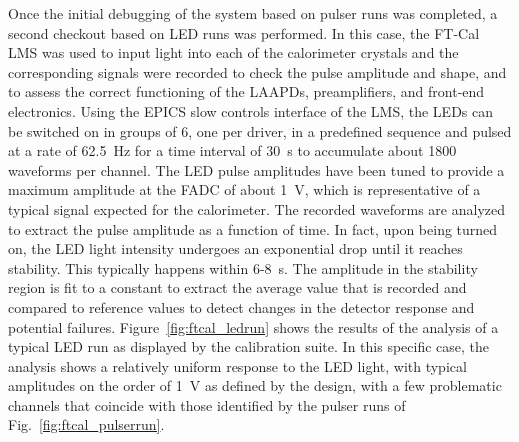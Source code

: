 Once the initial debugging of the system based on pulser runs was completed, a second checkout based on LED runs
was performed. In this case, the FT-Cal LMS was used to input light into each of the calorimeter crystals and the
corresponding signals were recorded to check the pulse amplitude and shape, and to assess the correct functioning of
the LAAPDs, preamplifiers, and front-end electronics. Using the EPICS slow controls interface of the LMS, the LEDs
can be switched on in groups of 6, one per driver, in a predefined sequence and pulsed at a rate of 62.5~Hz for a time
interval of 30~s to accumulate about 1800 waveforms per channel. The LED pulse amplitudes have been tuned to
provide a maximum amplitude at the FADC of about 1~V, which is representative of a typical signal expected for the
calorimeter. The recorded waveforms are analyzed to extract the pulse amplitude as a function of time. In fact, upon
being turned on, the LED light intensity undergoes an exponential drop until it reaches stability. This typically happens
within 6-8~s. The amplitude in the stability region is fit to a constant to extract the average value that is recorded
and compared to reference values to detect changes in the detector response and potential failures.
Figure~\ref{fig:ftcal_ledrun} shows the results of the analysis of a typical LED run as displayed by the calibration
suite. In this specific case, the analysis shows a relatively uniform response to the LED light, with typical amplitudes
on the order of 1~V as defined by the design, with a few problematic channels that coincide with those identified by
the pulser runs of Fig.~\ref{fig:ftcal_pulserrun}. 

